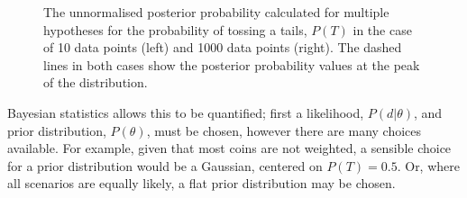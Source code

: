 \begin{figure}
\caption[Is my coin biased? An example of the strength of Bayesian statistics]{The unnormalised posterior probability calculated for multiple hypotheses for the probability of tossing a tails, $P(T)$ in the case of 10 data points (left) and 1000 data points (right). The dashed lines in both cases show the posterior probability values at the peak of the distribution.}
\label{fig:coin}
\end{figure}

Bayesian statistics {\minor allows this to be quantified}; first a likelihood, $P(d | \theta)$, and prior distribution, $P(\theta)$, {\minor must be chosen, however} there are many choices available. For example, given that most coins are not weighted, {\minor a sensible choice for a prior distribution would} be a Gaussian, centered on $P(T)=0.5$. Or, where all scenarios are equally likely, a flat prior distribution {\minor may be chosen}. 

